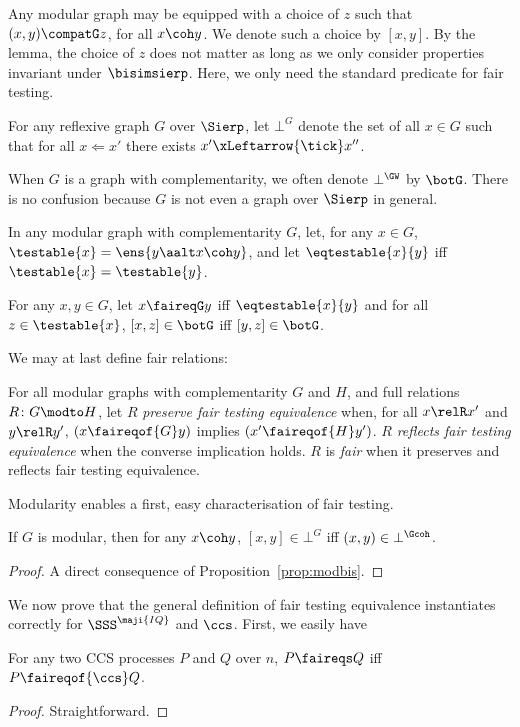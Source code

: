 \documentclass{LMCS}
\renewcommand{\QFI}{\maji{IQ}}
\renewcommand{\LLL}{\QFI}
\renewcommand{\SSSL}{\SSS^{\LLL}}
\theoremstyle{plain}\newtheorem{satz}[thm]{Satz}
\begin{document}
Any modular graph may be equipped with a choice of $z$ such that
$(x,y) \compatG z$, for all $x \coh y$. We denote such a choice by
$[x,y]$. By the lemma, the choice of $z$ does not matter as long as we
only consider properties invariant under $\bisimsierp$.  Here, we only
need the standard predicate for fair testing.

\begin{defi}
  For any reflexive graph $G$ over $\Sierp$, let $\bot^G$ denote the set of all
  $x \in G$ such that for all $x \Leftarrow x'$ there exists $x'
  \xLeftarrow{\tick} x''$.
\end{defi}
When $G$ is a graph with complementarity,
we often denote $\bot^{\GW}$ by $\botG$. There is no confusion because 
$G$ is not even a graph over $\Sierp$ in general.

In any modular graph with complementarity $G$, let, for any $x \in G$,
$\testable{x} = \ens{y \aalt x \coh y}$, and let $\eqtestable{x}{y}$
iff $\testable{x} = \testable{y}$.
\begin{defi}
  For any $x,y \in G$, let $x \faireqG y$ iff $\eqtestable{x}{y}$ and
  for all $z \in \testable{x}$, $[x,z] \in \botG$ iff $[y,z] \in
  \botG$.
\end{defi}

We may at last define fair relations:
\begin{defi}\label{def:fairrel}
  For all modular graphs with complementarity $G$ and $H$, and full
  relations $R \colon G \modto H$, let $R$ \emph{preserve fair testing
    equivalence} when, for all $x \relR x'$ and $y \relR y'$, $(x
  \faireqof{G} y)$ implies $(x' \faireqof{H} y')$.  $R$ \emph{reflects
    fair testing equivalence} when the converse implication holds.
  $R$ is \emph{fair} when it preserves and reflects fair testing
  equivalence.
\end{defi}

Modularity enables a first, easy characterisation of fair testing.
\begin{prop}
  If $G$ is modular, then for any $x \coh y$, $[x,y] \in \bot^G$ iff
  $(x,y) \in \bot^{\Gcoh}$.
\end{prop}
\begin{proof}
A direct consequence of Proposition~\ref{prop:modbis}.
\end{proof}

We now prove that the general definition of fair testing equivalence
instantiates correctly for $\SSSL$ and $\ccs$.  First, we easily have 
\begin{prop}\label{prop:fairccs}
  For any two CCS processes $P$ and $Q$ over $n$, $P \faireqs Q$ iff
  $P \faireqof{\ccs} Q$.
\end{prop}
\begin{proof}
  Straightforward.
\end{proof}
\end{document}
